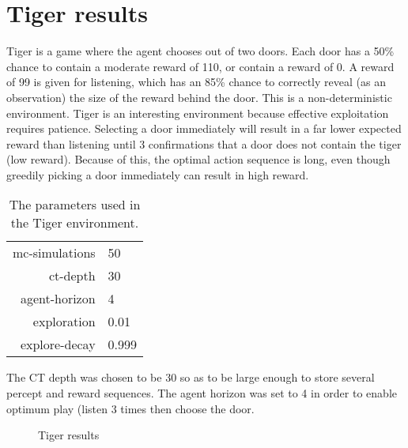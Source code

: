 \documentclass[pdftex,twoside,a4paper]{report}
\begin{document}
\section{Tiger results}
Tiger is a game where the agent chooses out of two doors. Each door has a 50\% chance to contain a moderate reward of 110, or contain a reward of 0. A reward of 99 is given for listening, which has an 85\% chance to correctly reveal (as an observation) the size of the reward behind the door. This is a non-deterministic environment. Tiger is an interesting environment because effective exploitation requires patience. Selecting a door immediately will result in a far lower expected reward than listening until 3 confirmations that a door does not contain the tiger (low reward). Because of this, the optimal action sequence is long, even though greedily picking a door immediately can result in high reward.

\begin{table}[h]
\begin{center}
\begin{tabular}{| r | l | }
\hline
mc-simulations & 50\\
ct-depth & 30\\
agent-horizon & 4\\
exploration & 0.01\\
explore-decay & 0.999\\
\hline
\end{tabular}
\caption{The parameters used in the Tiger environment.}
\end{center}
\end{table}

The CT depth was chosen to be 30 so as to be large enough to store several percept and reward sequences. The agent horizon was set to 4 in order to enable optimum play (listen 3 times then choose the door.

 \begin{figure}[h]
   \begin{center}
   \end{center}
   \caption{Tiger results}
   \label{fig:tiger_results}
 \end{figure}
\end{document}
